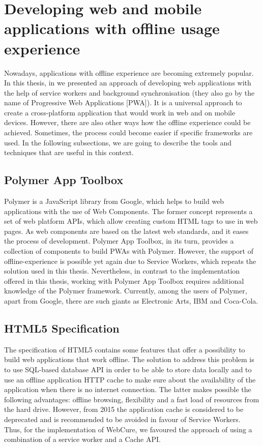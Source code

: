 \section{Developing web and mobile applications with offline usage experience}

Nowadays, applications with offline experience are becoming extremely popular. In this thesis, in  we presented an approach of developing web applications with the help of service workers and background synchronisation (they also go by the name of Progressive Web Applications [PWA]). It is a universal approach to create a cross-platform application that would work in web and on mobile devices. However, there are also other ways how the offline experience could be achieved. Sometimes, the process could become easier if specific frameworks are used. In the following subsections, we are going to describe the tools and techniques that are useful in this context. 


\subsection*{Polymer App Toolbox}

Polymer is a JavaScript library from Google, which helps to build web applications with the use of Web Components. The former concept represents a set of web platform APIs, which allow creating custom HTML tags to use in web pages\cite{16}. As web components are based on the latest web standards, and it eases the process of development. Polymer App Toolbox, in its turn, provides a collection of components to build PWAs with Polymer. However, the support of offline-experience is possible yet again due to Service Workers\cite{18}, which repeats the solution used in this thesis. Nevertheless, in contrast to the implementation offered in this thesis, working with Polymer App Toolbox requires additional knowledge of the Polymer framework. Currently, among the users of Polymer, apart from Google, there are such giants as Electronic Arts, IBM and Coca-Cola\cite{17}.

\subsection*{HTML5 Specification}

The specification of HTML5 contains some features that offer a possibility to build web applications that work offline. The solution to address this problem is to use SQL-based database API in order to be able to store data locally and to use an offline application HTTP cache to make sure about the availability of the application when there is no internet connection. The latter makes possible the following advantages: offline browsing, flexibility and a fast load of resources from the hard drive\cite{20}. However, from 2015 the application cache is considered to be deprecated and is recommended to be avoided\cite{21} in favour of Service Workers. Thus, for the implementation of WebCure, we favoured the approach of using a combination of a service worker and a Cache API.
 
